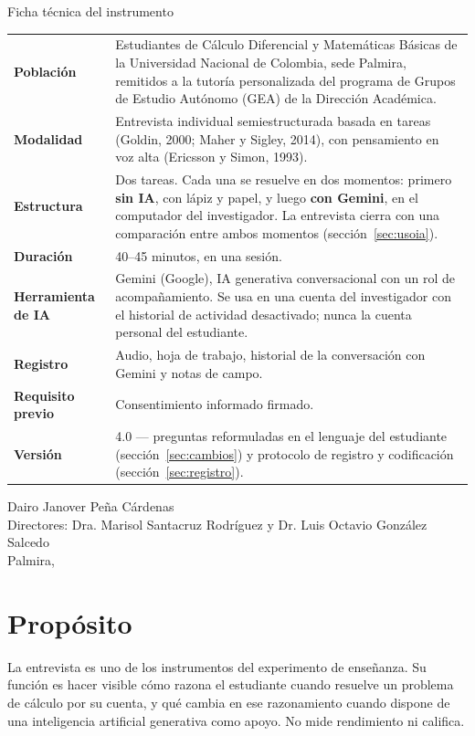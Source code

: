 \documentclass[11pt,letterpaper]{article}
\newcounter{preg}
\begin{document}
\begin{titlepage}
\begin{caja}{Ficha técnica del instrumento}
\small
\begin{tabularx}{\linewidth}{@{}>{\bfseries}p{3.6cm}L@{}}
Población & Estudiantes de Cálculo Diferencial y Matemáticas Básicas de la Universidad Nacional de Colombia, sede Palmira, remitidos a la tutoría personalizada del programa de Grupos de Estudio Autónomo (GEA) de la Dirección Académica.\\
Modalidad & Entrevista individual semiestructurada basada en tareas (Goldin, 2000; Maher y Sigley, 2014), con pensamiento en voz alta (Ericsson y Simon, 1993).\\
Estructura & Dos tareas. Cada una se resuelve en dos momentos: primero \textbf{sin IA}, con lápiz y papel, y luego \textbf{con Gemini}, en el computador del investigador. La entrevista cierra con una comparación entre ambos momentos (sección~\ref{sec:usoia}).\\
Duración & 40--45 minutos, en una sesión.\\
Herramienta de IA & Gemini (Google), IA generativa conversacional con un rol de acompañamiento. Se usa en una cuenta del investigador con el historial de actividad desactivado; nunca la cuenta personal del estudiante.\\
Registro & Audio, hoja de trabajo, historial de la conversación con Gemini y notas de campo.\\
Requisito previo & Consentimiento informado firmado.\\
Versión & 4.0 --- preguntas reformuladas en el lenguaje del estudiante (sección~\ref{sec:cambios}) y protocolo de registro y codificación (sección~\ref{sec:registro}).
\end{tabularx}
\end{caja}
\vfill
{\small Dairo Janover Peña Cárdenas\\ Directores: Dra. Marisol Santacruz Rodríguez y Dr. Luis Octavio González Salcedo\\[6pt] Palmira, \the\year\par}
\end{titlepage}

\tableofcontents
\newpage

\section{Propósito}

La entrevista es uno de los instrumentos del experimento de enseñanza. Su función es hacer visible cómo razona el estudiante cuando resuelve un problema de cálculo por su cuenta, y qué cambia en ese razonamiento cuando dispone de una inteligencia artificial generativa como apoyo. No mide rendimiento ni califica.
\end{document}
